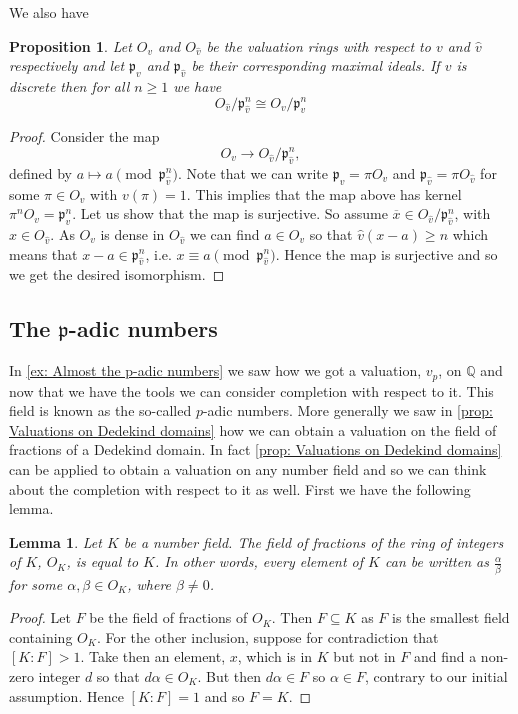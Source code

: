 \documentclass{article}
\newtheorem{proposition}{Proposition}[section]
\newtheorem{lemma}{Lemma}[section]
\newcommand{\mfrak}[1]{\mathfrak{#1}}
\newcommand{\mbb}[1]{\mathbb{#1}}
\numberwithin{equation}{section}
\begin{document}
We also have
\begin{proposition}\label{prop: Isomorphism of residue fields valued field and its completion}
	Let $O_v$ and $O_{\hat v}$ be the valuation rings with respect to $v$ and $\hat v$ respectively and let $\mfrak p_v$ and $\mfrak p_{\hat v}$ be their corresponding maximal ideals.
	If $v$ is discrete then for all $n \geq 1$ we have
	$$O_{\hat v} / \mfrak p_{\hat v}^n \cong O_v / \mfrak p_v^n$$
\end{proposition}
\begin{proof}
	Consider the map $$O_v \to O_{\hat v} / \mfrak p_{\hat v}^n,$$ defined by $a \mapsto a \pmod {\mfrak p_{\hat v}^n}$. Note that we can write $\mfrak p_v = \pi O_v$ and $\mfrak p_{\hat v} = \pi O_{\hat v}$ for some $\pi \in O_v$ with $v(\pi) = 1$. This implies that the map above has kernel $\pi^n O_v = \mfrak p_v^n$. Let us show that the map is surjective. So assume $\overline x \in O_{\hat v} / \mfrak p_{\hat v}^n$, with $x \in O_{\hat v}$. As $O_v$ is dense in $O_{\hat v}$ we can find $a \in O_v$ so that $\hat v(x - a) \geq n$ which means that $x - a \in \mfrak p_{\hat v}^n$, i.e. $x \equiv a \pmod {\mfrak p_{\hat v}^n}$. Hence the map is surjective and so we get the desired isomorphism.
\end{proof}

\subsection{The $\mfrak p$-adic numbers}
In \cref{ex: Almost the p-adic numbers} we saw how we got a valuation, $v_p$, on $\mbb Q$ and now that we have the tools we can consider completion with respect to it. This field is known as the so-called $p$-adic numbers. More generally we saw in \cref{prop: Valuations on Dedekind domains} how we can obtain a valuation on the field of fractions of a Dedekind domain. In fact \cref{prop: Valuations on Dedekind domains} can be applied to obtain a valuation on any number field and so we can think about the completion with respect to it as well. First we have the following lemma.

\begin{lemma} \label{lem: Field of fractions of ring of integers is number field}
	Let $K$ be a number field. The field of fractions of the ring of integers of $K$, $O_K$, is equal to $K$. In other words, every element of $K$ can be written as $\frac{\alpha}{\beta}$ for some $\alpha, \beta \in O_K$, where $\beta \neq 0$.
\end{lemma}
\begin{proof}
	Let $F$ be the field of fractions of $O_K$. Then $F \subseteq K$ as $F$ is the smallest field containing $O_K$. For the other inclusion, suppose for contradiction that $[K : F] > 1$. Take then an element, $x$, which is in $K$ but not in $F$ and find a non-zero integer $d$ so that $d \alpha \in O_K$. But then $d \alpha \in F$ so $\alpha \in F$, contrary to our initial assumption. Hence $[K : F] = 1$ and so $F = K$.
\end{proof}
\end{document}
